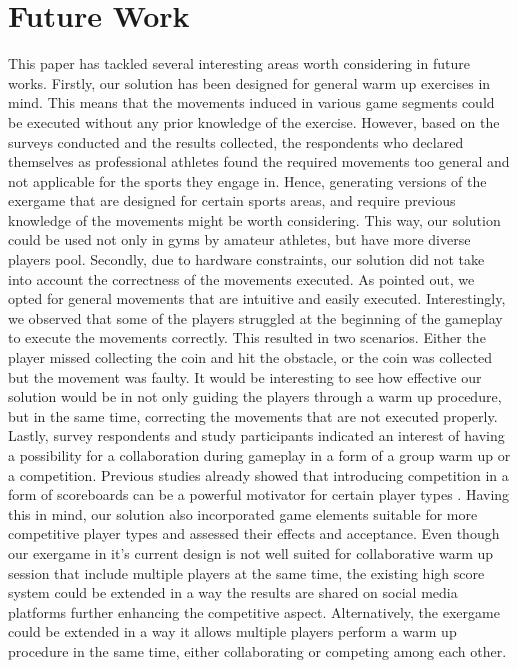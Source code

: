\section{Future Work}
This paper has tackled several interesting areas worth considering in future works. 
Firstly, our solution has been designed for general warm up exercises in mind. This means that the movements induced in various game segments could be executed without any prior knowledge of the exercise. However, based on the surveys conducted and the results collected, the respondents who declared themselves as professional athletes found the required movements too general and not applicable for the sports they engage in. Hence, generating versions of the exergame that are designed for certain sports areas, and require previous knowledge of the movements might be worth considering. This way, our solution could be used not only in gyms by amateur athletes, but have more diverse players pool. Secondly, due to hardware constraints, our solution did not take into account the correctness of the movements executed. As pointed out, we opted for general movements that are intuitive and easily executed. Interestingly, we observed that some of the players struggled at the beginning of the gameplay to execute the movements correctly. This resulted in two scenarios. Either the player missed collecting the coin and hit the obstacle, or the coin was collected but the movement was faulty. It would be interesting to see how effective our solution would be in not only guiding the players through a warm up procedure, but in the same time, correcting the movements that are not executed properly. Lastly, survey respondents and study participants indicated an interest of having a possibility for a collaboration during gameplay in a form of a group warm up or a competition. Previous studies already showed that introducing competition in a form of scoreboards can be a powerful motivator for certain player types \cite{zichermann2011gamification, werbach2012win}. Having this in mind, our solution also incorporated game elements suitable for more competitive player types and assessed their effects and acceptance. Even though our exergame in it's current design is not well suited for collaborative warm up session that include multiple players at the same time, the existing high score system could be extended in a way the results are shared on social media platforms further enhancing the competitive aspect. Alternatively, the exergame could be extended in a way it allows multiple players perform a warm up procedure in the same time, either collaborating or competing among each other. 
